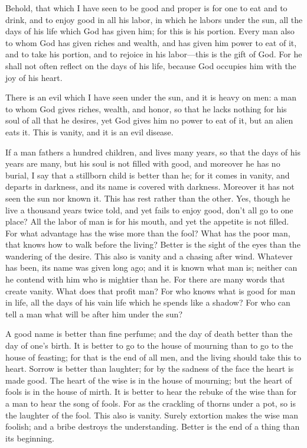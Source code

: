 \myverse{}Behold, that which I have seen to be good and proper is for one
to eat and to drink, and to enjoy good in all his labor, in which he labors under the sun, all the days
of his life which God has given him; for this is his portion.
\myverse{}Every man also to whom God has given riches and wealth, and has given him
power to eat of it, and to take his portion, and to rejoice in his labor—this is the gift of God.
\myverse{}For he shall not often reflect on the days of his life, because God occupies
him with the joy of his heart.



\mychapter{} \myverse*{}There is an evil which I have seen under the sun, and it is heavy
on men:
\myverse{}a man to whom God gives riches, wealth, and honor, so that he lacks nothing
for his soul of all that he desires, yet God gives him no power to eat of it, but an alien eats it. This
is vanity, and it is an evil disease.

\myverse{}If a man fathers a hundred children, and lives many years, so that
the days of his years are many, but his soul is not filled with good, and moreover he has no burial, I
say that a stillborn child is better than he;
\myverse{}for it comes in vanity, and departs in darkness, and its name is covered with
darkness.
\myverse{}Moreover it has not seen the sun nor known it. This has rest rather than the
other.
\myverse{}Yes, though he live a thousand years twice told, and yet fails to enjoy good,
don’t all go to one place?
\myverse{}All the labor of man is for his mouth, and yet the appetite is not filled.
\myverse{}For what advantage has the wise more than the fool? What has the poor man, that
knows how to walk before the living?
\myverse{}Better is the sight of the eyes than the wandering of the desire. This also
is vanity and a chasing after wind.
\myverse{}Whatever has been, its name was given long ago; and it is known what man is;
neither can he contend with him who is mightier than he.
\myverse{}For there are many words that create vanity. What does that profit man?
\myverse{}For who knows what is good for man in life, all the days of his vain life
which he spends like a shadow? For who can tell a man what will be after him under the sun?



\mychapter{} \myverse*{}A good name is better than fine perfume; and the day of death better
than the day of one’s birth.
\myverse{}It is better to go to the house of mourning than to go to the house of feasting;
for that is the end of all men, and the living should take this to heart.
\myverse{}Sorrow is better than laughter; for by the sadness of the face the heart is
made good.
\myverse{}The heart of the wise is in the house of mourning; but the heart of fools is
in the house of mirth.
\myverse{}It is better to hear the rebuke of the wise than for a man to hear the song
of fools.
\myverse{}For as the crackling of thorns under a pot, so is the laughter of the fool.
This also is vanity.
\myverse{}Surely extortion makes the wise man foolish; and a bribe destroys the understanding.
\myverse{}Better is the end of a thing than its beginning.

